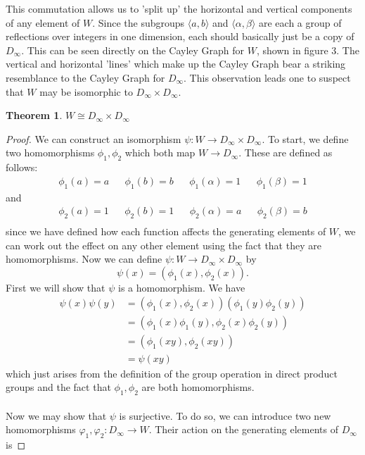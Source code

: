 \documentclass{article}
\newtheorem{theorem}{Theorem}
\theoremstyle{definition}
\begin{document}
This commutation allows us to 'split up' the horizontal and vertical components of any element of $W$. Since the subgroups $\langle a, b\rangle $ and $\langle \alpha ,\beta \rangle$ are each a group of reflections over integers in one dimension, each should basically just be a copy of $D_\infty$. This can be seen directly on the Cayley Graph for $W$, shown in figure 3. The vertical and horizontal 'lines' which make up the Cayley Graph bear a striking resemblance to the Cayley Graph for $D_\infty$. This observation leads one to suspect that $W$ may be isomorphic to $D_\infty \times D_\infty$. 
\begin{theorem}
    $W\cong D_\infty \times D_\infty$
\end{theorem}
\begin{proof}
We can construct an isomorphism $\psi :W\rightarrow D_\infty \times D_\infty$. To start, we define two homomorphisms $\phi _1, \phi _2$ which both map $W\rightarrow D_\infty$. These are defined as follows:
\begin{align*}
    \phi _1(a)=a && \phi _1(b)=b && \phi _1(\alpha)=1 && \phi _1(\beta)=1
\end{align*}
and
\begin{align*}
    \phi_2(a)=1 && \phi _2(b)=1 && \phi_2(\alpha)=a && \phi_2(\beta)=b\\
\end{align*}
since we have defined how each function affects the generating elements of $W$, we can work out the effect on any other element using the fact that they are homomorphisms. Now we can define $\psi :W\rightarrow D_\infty \times D_\infty$ by 
\begin{equation*}
    \psi (x)=(\phi _1(x),\phi_2(x)).
\end{equation*}
First we will show that $\psi$ is a homomorphism. We have 
\begin{align*}
    \psi (x)\psi (y)&=(\phi _1(x),\phi _2(x))(\phi _1(y)\phi _2(y))\\
    &=(\phi _1(x)\phi _1(y),\phi_2(x)\phi_2(y))\\
    &=(\phi _1(xy),\phi _2(xy))\\
    &=\psi (xy)
\end{align*}
which just arises from the definition of the group operation in direct product groups and the fact that $\phi _1,\phi _2$ are both homomorphisms. \\
\\
Now we may show that $\psi$ is surjective. To do so, we can introduce two new homomorphisms $\varphi _1,\varphi_2:D_\infty \rightarrow W$. Their action on the generating elements of $D_\infty$ is 

\end{proof}
\end{document}
